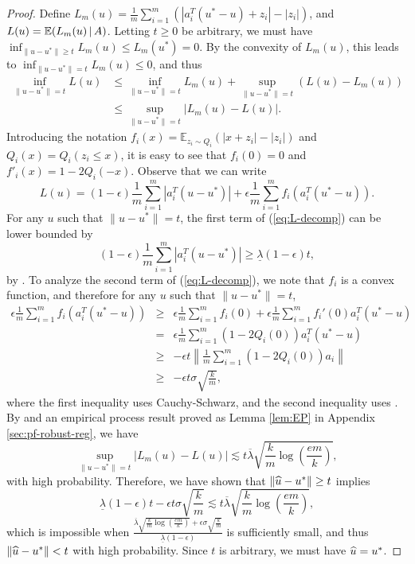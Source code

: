 \begin{proof}
Define $L_m(u)=\frac{1}{m}\sum_{i=1}^m(|a_i^T(u^*-u)+z_i|-|z_i|)$, and $L(u)=\mathbb{E}(L_m(u) \,|\, A)$.
Letting $t\geq 0$ be arbitrary, we must have $\inf_{\|u-u^*\|\geq t}L_m(u)\leq L_m(u^*)=0$. By the convexity of $L_m(u)$, this leads to $\inf_{\|u-u^*\|= t}L_m(u)\leq 0$, and thus
\begin{align*}
\inf_{\|u-u^*\|=t}L(u) &\leq \inf_{\|u-u^*\|=t}L_m(u) + \sup_{\|u-u^*\|=t} \left(L(u) - L_m(u)\right) \\
& \leq \sup_{\|u-u^*\|=t}|L_m(u)-L(u)|.
\end{align*}
Introducing the notation $f_i(x)=\mathbb{E}_{z_i\sim Q_i}(|x+z_i|-|z_i|)$ and $Q_i(x)=Q_i(z_i\leq x)$,
it is easy to see that $f_i(0)=0$ and $f'_i(x)=1-2Q_i(-x)$. Observe that we can write
\begin{equation}
L(u)=(1-\epsilon)\frac{1}{m}\sum_{i=1}^m|a_i^T(u-u^*)| + \epsilon\frac{1}{m}\sum_{i=1}^mf_i(a_i^T(u^*-u)). \label{eq:L-decomp}
\end{equation}
For any $u$ such that $\|u-u^*\|=t$, the first term of (\ref{eq:L-decomp}) can be lower bounded by
$$(1-\epsilon)\frac{1}{m}\sum_{i=1}^m|a_i^T(u-u^*)| \geq \underline{\lambda}(1-\epsilon)t,$$
by \conditionB. To analyze the second term of (\ref{eq:L-decomp}), we note that $f_i$ is a convex function, and therefore
for any $u$ such that $\|u-u^*\|=t$,
\begin{eqnarray*}
\epsilon\frac{1}{m}\sum_{i=1}^mf_i(a_i^T(u^*-u)) &\geq& \epsilon\frac{1}{m}\sum_{i=1}^mf_i(0) + \epsilon\frac{1}{m}\sum_{i=1}^mf_i'(0)a_i^T(u^*-u) \\
&=& \epsilon\frac{1}{m}\sum_{i=1}^m\left(1-2Q_i(0)\right)a_i^T(u^*-u) \\
&\geq& -\epsilon t\left\|\frac{1}{m}\sum_{i=1}^m\left(1-2Q_i(0)\right)a_i\right\| \\
&\geq& -\epsilon t\sigma\sqrt{\frac{k}{m}},
\end{eqnarray*}
where the first inequality uses Cauchy-Schwarz, and the second inequality uses \conditionA.
By \conditionB{} and an empirical process result proved as Lemma \ref{lem:EP} in Appendix \ref{sec:pf-robust-reg}, we have
\begin{equation}
\sup_{\|u-u^*\|= t}|L_m(u)-L(u)| \lesssim t\overline{\lambda}\sqrt{\frac{k}{m}\log\left(\frac{em}{k}\right)}, \label{eq:upper-EP}
\end{equation}
with high probability.
Therefore, we have shown that $\|\widehat{u}-u^*\|\geq t$ implies
$$\underline{\lambda}(1-\epsilon)t - \epsilon t\sigma\sqrt{\frac{k}{m}} \lesssim t\overline{\lambda}\sqrt{\frac{k}{m}\log\left(\frac{em}{k}\right)},$$
which is impossible when $\frac{\overline{\lambda}\sqrt{\frac{k}{m}\log\left(\frac{em}{k}\right)}+\epsilon\sigma\sqrt{\frac{k}{m}}}{\underline{\lambda}(1-\epsilon)}$ is sufficiently small, and thus $\|\widehat{u}-u^*\|< t$ with high probability. Since $t$ is arbitrary, we must have $\widehat{u}=u^*$.
\end{proof}

